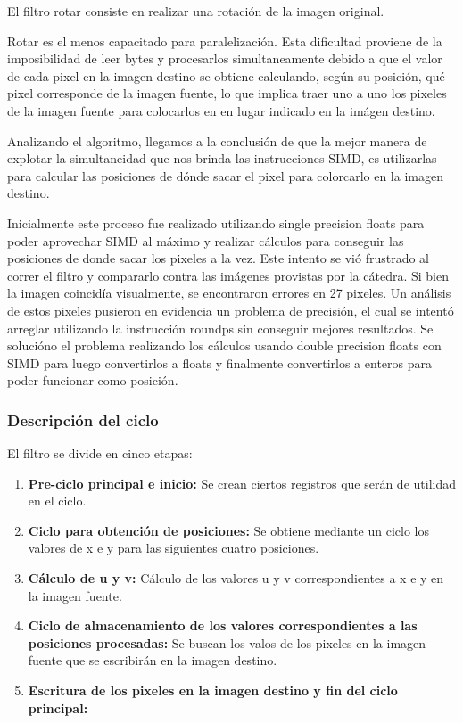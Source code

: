El filtro rotar consiste en realizar una rotación de la imagen original.

Rotar es el menos capacitado para paralelización. Esta dificultad proviene de la imposibilidad de leer bytes y procesarlos simultaneamente debido a que el valor de cada pixel en la imagen destino se obtiene calculando, según su posición, qué pixel corresponde de la imagen fuente, lo que implica traer uno a uno los pixeles de la imagen fuente para colocarlos en en lugar indicado en la imágen destino.

Analizando el algoritmo, llegamos a la conclusión de que la mejor manera de explotar la simultaneidad que nos brinda las instrucciones SIMD, es utilizarlas para calcular las posiciones de dónde sacar el pixel para colorcarlo en la imagen destino. 

Inicialmente este proceso fue realizado utilizando single precision floats para poder aprovechar SIMD al máximo y realizar cálculos para conseguir las posiciones de donde sacar los pixeles a la vez. Este intento se vió frustrado al correr el filtro y compararlo contra las imágenes provistas por la cátedra. Si bien la imagen coincidía visualmente, se encontraron errores en 27 pixeles. Un análisis de estos pixeles pusieron en evidencia un problema de precisión, el cual se intentó arreglar utilizando la instrucción roundps sin conseguir mejores resultados. Se solucióno el problema realizando los cálculos usando double precision floats con SIMD para luego convertirlos a floats y finalmente convertirlos a enteros para poder funcionar como posición.

\subsubsection{Descripción del ciclo}
El filtro se divide en cinco etapas:
\begin{enumerate}
\item \textbf{Pre-ciclo principal e inicio:} Se crean ciertos registros que serán de utilidad en el ciclo.
\item \textbf{Ciclo para obtención de posiciones:} Se obtiene mediante un ciclo los valores de x e y para las siguientes cuatro posiciones.
\item \textbf{Cálculo de u y v:} Cálculo de los valores u y v correspondientes a x e y en la imagen fuente.
\item \textbf{Ciclo de almacenamiento de los valores correspondientes a las posiciones procesadas:} Se buscan los valos de los pixeles en la imagen fuente que se escribirán en la imagen destino.
\item \textbf{Escritura de los pixeles en la imagen destino y fin del ciclo principal:}
\end{enumerate}


